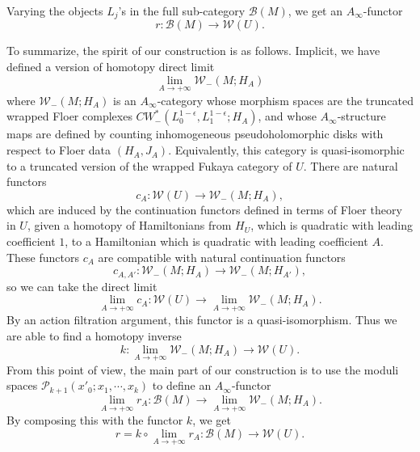 \documentclass{amsart}
\numberwithin{equation}{section}
\numberwithin{figure}{section}
\begin{document}
	Varying the objects $L_{j}$'s in the full sub-category $\mathcal{B}(M)$, we get an $A_{\infty}$-functor
\begin{equation}
r: \mathcal{B}(M) \to \mathcal{W}(U).
\end{equation} \par
	To summarize, the spirit of our construction is as follows. Implicit, we have defined a version of homotopy direct limit
\begin{equation*}
\lim\limits_{A \to +\infty} \mathcal{W}_{-}(M; H_{A})
\end{equation*}
where $\mathcal{W}_{-}(M; H_{A})$ is an $A_{\infty}$-category whose morphism spaces are the truncated wrapped Floer complexes $CW^{*}_{-}(L_{0}^{1-\epsilon}, L_{1}^{1-\epsilon}; H_{A})$, and whose $A_{\infty}$-structure maps are defined by counting inhomogeneous pseudoholomorphic disks with respect to Floer data $(H_{A}, J_{A})$. Equivalently, this category is quasi-isomorphic to a truncated version of the wrapped Fukaya category of $U$. There are natural functors
\begin{equation*}
c_{A}: \mathcal{W}(U) \to \mathcal{W}_{-}(M; H_{A}),
\end{equation*}
which are induced by the continuation functors defined in terms of Floer theory in $U$, given a homotopy of Hamiltonians from $H_{U}$, which is quadratic with leading coefficient $1$, to a Hamiltonian which is quadratic with leading coefficient $A$. These functors $c_{A}$ are compatible with natural continuation functors
\begin{equation*}
c_{A, A'}: \mathcal{W}_{-}(M; H_{A}) \to \mathcal{W}_{-}(M; H_{A'}),
\end{equation*}
so we can take the direct limit
\begin{equation*}
\lim\limits_{A \to +\infty} c_{A}: \mathcal{W}(U) \to \lim\limits_{A \to +\infty} \mathcal{W}_{-}(M; H_{A}).
\end{equation*}
By an action filtration argument, this functor is a quasi-isomorphism. Thus we are able to find a homotopy inverse
\begin{equation*}
k: \lim\limits_{A \to +\infty} \mathcal{W}_{-}(M; H_{A}) \to \mathcal{W}(U).
\end{equation*}
From this point of view, the main part of our construction is to use the moduli spaces $\mathcal{P}_{k+1}(x'_{0}; x_{1}, \cdots, x_{k})$ to define an $A_{\infty}$-functor
\begin{equation*}
\lim\limits_{A \to +\infty} r_{A}: \mathcal{B}(M) \to \lim\limits_{A \to +\infty} \mathcal{W}_{-}(M; H_{A}).
\end{equation*}
By composing this with the functor $k$, we get
\begin{equation*}
r = k \circ \lim\limits_{A \to +\infty} r_{A}: \mathcal{B}(M) \to \mathcal{W}(U).
\end{equation*} \par
\end{document}
